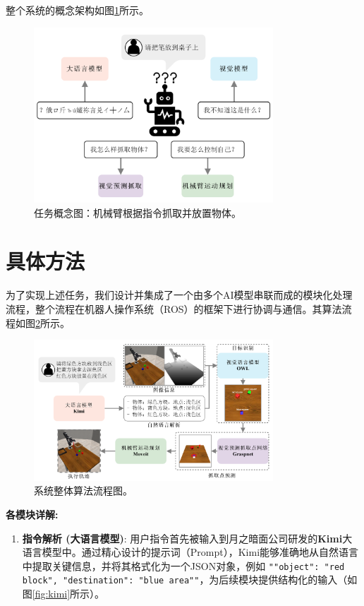 \documentclass{article}
\begin{document}
\begin{CJK*}{UTF8}{gbsn}
整个系统的概念架构如图\ref{fig:concept}所示。
\begin{figure}[h!]
    \centering
    \includegraphics[width=0.8\textwidth]{image/report/fig_concept.png}
    \caption{任务概念图：机械臂根据指令抓取并放置物体。}
    \label{fig:concept}
\end{figure}

\section{具体方法}

为了实现上述任务，我们设计并集成了一个由多个AI模型串联而成的模块化处理流程，整个流程在机器人操作系统（ROS）的框架下进行协调与通信。其算法流程如图\ref{fig:flowchart}所示。

\begin{figure}[h!]
    \centering
    \includegraphics[width=0.8\textwidth]{image/report/fig_flowchart.png}
    \caption{系统整体算法流程图。}
    \label{fig:flowchart}
\end{figure}

\textbf{各模块详解:}

\begin{enumerate}
    \item  \textbf{指令解析 (大语言模型)}: 用户指令首先被输入到月之暗面公司研发的\textbf{Kimi}大语言模型中。通过精心设计的提示词（Prompt），Kimi能够准确地从自然语言中提取关键信息，并将其格式化为一个JSON对象，例如 \texttt{"{"object": "red block", "destination": "blue area"}"}，为后续模块提供结构化的输入（如图\ref{fig:kimi}所示）。
\end{enumerate}


\end{CJK*}
\end{document}
